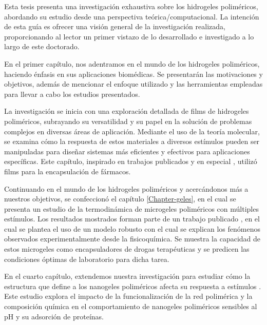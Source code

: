 \label{ruta}

 
Esta tesis presenta una investigaci\'on exhaustiva sobre los hidrogeles polim\'ericos, abordando su estudio desde una perspectiva te\'orica/computacional. La intenci\'on de esta gu\'ia es ofrecer una visi\'on general de la investigaci\'on realizada, proporcionando al lector un primer vistazo de lo desarrollado e investigado a lo largo de este doctorado.

En el primer cap\'itulo, nos adentramos en el mundo de los hidrogeles polim\'ericos, haciendo \'enfasis en sus aplicaciones biom\'edicas. Se presentar\'an las motivaciones y objetivos, adem\'as de mencionar el enfoque utilizado y las herramientas empleadas para llevar a cabo los estudios presentados.

La investigaci\'on se inicia con una exploraci\'on detallada de films de hidrogeles polim\'ericos, subrayando su versatilidad y su papel en la soluci\'on de problemas complejos en diversas \'areas de aplicaci\'on. Mediante el uso de la teor\'ia molecular, se examina c\'omo la respuesta de estos materiales a diversos est\'imulos pueden ser manipuladas para dise\~nar sistemas m\'as eficientes y efectivos para aplicaciones espec\'ificas. Este cap\'itulo, inspirado en trabajos publicados \cite{perez2018using, perez2019molecular} y en especial \cite{perez2020triggering}, utiliz\'o films para la encapsulaci\'on de f\'armacos.

Continuando en el mundo de los hidrogeles polim\'ericos y acerc\'andonos m\'as a nuestros objetivos, se confeccion\'o el cap\'itulo \ref{Chapter-geles}, en el cual se presenta un estudio de la termodin\'amica de microgeles polim\'ericos con m\'ultiples est\'imulos. Los resultados mostrados forman parte de un trabajo publicado \cite{perez2021thermodynamic}, en el cual se plantea el uso de un modelo robusto con el cual se explican los fen\'omenos observados experimentalmente desde la fisicoqu\'imica. Se muestra la capacidad de estos microgeles como encapsuladores de drogas terap\'euticas y se predicen las condiciones \'optimas de laboratorio para dicha tarea.

En el cuarto cap\'itulo, extendemos nuestra investigaci\'on para estudiar c\'omo la estructura que define a los nanogeles polim\'ericos afecta su respuesta a est\'imulos \cite{na10.1021/acs.jpcb.3c07283}. Este estudio explora el impacto de la funcionalizaci\'on de la red polim\'erica y la composici\'on qu\'imica en el comportamiento de nanogeles polim\'ericos sensibles al pH y su adsorci\'on de prote\'inas.

